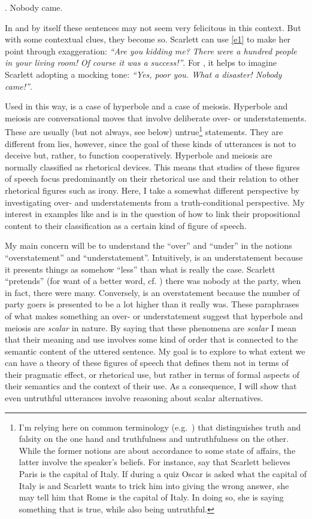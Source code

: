\documentclass[a4paper,12pt,twoside]{article}
\begin{document}
\ex. \label{e2} Nobody came.

In and by itself these sentences may not seem very felicitous in this context. But with some contextual clues, they become so. Scarlett can use \ref{e1} to make her point through exaggeration: \emph{``Are you kidding me?} \emph{There were a hundred people in your living room!} \emph{Of course it was a success!''}. For \Last, it helps to imagine Scarlett adopting a mocking tone: \emph{``Yes, poor you. What a disaster! Nobody came!''}.

\noindent Used in this way, \LLast is a case of hyperbole and \Last a case of meiosis. Hyperbole and meiosis are conversational moves that involve deliberate over- or understatements. These are usually (but not always, see below) untrue\footnote{I'm relying here on common terminology (e.g.~\citealt{dynel_two_2016}) that distinguishes truth and falsity on the one hand and truthfulness and untruthfulness on the other. While the former notions are about accordance to some state of affairs, the latter involve the speaker's beliefs. For instance, say that Scarlett believes Paris is the capital of Italy. If during a quiz Oscar is asked what the capital of Italy is and Scarlett wants to trick him into giving the wrong answer, she may tell him that Rome is the capital of Italy. In doing so, she is saying something that is true, while also being untruthful.} statements. They are different from lies, however, since the goal of these kinds of utterances is not to deceive but, rather, to function cooperatively.
Hyperbole and meiosis are normally classified as rhetorical devices. This means that studies of these figures of speech focus predominantly on their rhetorical use and their relation to other rhetorical figures such as irony. Here, I take a somewhat different perspective by investigating over- and understatements from a truth-conditional perspective. My interest in examples like \LLast and \Last is in the question of how to link their propositional content to their classification as a certain kind of figure of speech.

My main concern will be to understand the ``over'' and ``under'' in the notions ``overstatement'' and ``understatement''. Intuitively, \Last is an understatement because it presents things as somehow ``less'' than what is really the case. Scarlett ``pretends'' (for want of a better word, cf. \citealt{wilson16} ) there was nobody at the party, when in fact, there were many. Conversely, \LLast is an overstatement because the number of party goers is presented to be a lot higher than it really was. These paraphrases of what makes something an over- or understatement suggest that hyperbole and meiosis are \emph{scalar} in nature. By saying that these phenomena are \emph{scalar} I mean that their meaning and use involves some kind of order that is connected to the semantic content of the uttered sentence. My goal is to explore to what extent we can have a theory of these figures of speech that defines them not in terms of their pragmatic effect, or rhetorical use, but rather in terms of formal aspects of their semantics and the context of their use. As a consequence, I will show that even untruthful utterances involve reasoning about scalar alternatives.
\end{document}
